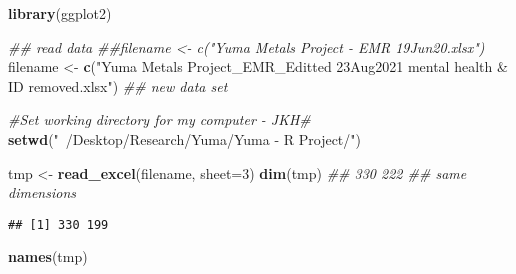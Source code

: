 \documentclass[]{article}
\newenvironment{Shaded}{\begin{snugshade}}{\end{snugshade}}
\newcommand{\CommentTok}[1]{\textcolor[rgb]{0.56,0.35,0.01}{\textit{#1}}}
\newcommand{\DataTypeTok}[1]{\textcolor[rgb]{0.13,0.29,0.53}{#1}}
\newcommand{\DecValTok}[1]{\textcolor[rgb]{0.00,0.00,0.81}{#1}}
\newcommand{\KeywordTok}[1]{\textcolor[rgb]{0.13,0.29,0.53}{\textbf{#1}}}
\newcommand{\NormalTok}[1]{#1}
\newcommand{\StringTok}[1]{\textcolor[rgb]{0.31,0.60,0.02}{#1}}
\begin{document}
\begin{Shaded}
\begin{Highlighting}[]
\KeywordTok{library}\NormalTok{(ggplot2)}

\CommentTok{## read data}
\CommentTok{##filename <- c("Yuma Metals Project - EMR 19Jun20.xlsx")}
\NormalTok{filename <-}\StringTok{ }\KeywordTok{c}\NormalTok{(}\StringTok{"Yuma Metals Project_EMR_Editted 23Aug2021 mental health & ID removed.xlsx"}\NormalTok{) }\CommentTok{## new data set}

\CommentTok{#Set working directory for my computer - JKH#}
\KeywordTok{setwd}\NormalTok{(}\StringTok{"~/Desktop/Research/Yuma/Yuma - R Project/"}\NormalTok{)}

\NormalTok{tmp <-}\StringTok{ }\KeywordTok{read_excel}\NormalTok{(filename, }\DataTypeTok{sheet=}\DecValTok{3}\NormalTok{)}
\KeywordTok{dim}\NormalTok{(tmp) }\CommentTok{## 330 222 ## same dimensions}
\end{Highlighting}
\end{Shaded}

\begin{verbatim}
## [1] 330 199
\end{verbatim}

\begin{Shaded}
\begin{Highlighting}[]
 \KeywordTok{names}\NormalTok{(tmp)}
\end{Highlighting}
\end{Shaded}
\end{document}
